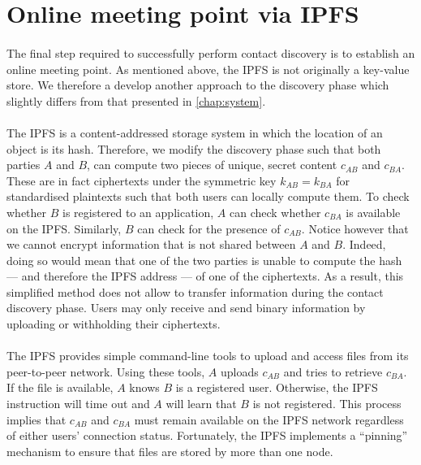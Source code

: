 \section{Online meeting point via IPFS}

	\paragraph{} The final step required to successfully perform contact discovery is to establish an online meeting point. As mentioned above, the IPFS is not originally a key-value store. We therefore a develop another approach to the discovery phase which slightly differs from that presented in \autoref{chap:system}.
	
	\paragraph{} The IPFS is a content-addressed storage system in which the location of an object is its hash. Therefore, we modify the discovery phase such that both parties $A$ and $B$, can compute two pieces of unique, secret content $c_{AB}$ and $c_{BA}$. These are in fact ciphertexts under the symmetric key $k_{AB} = k_{BA}$ for standardised plaintexts such that both users can locally compute them. To check whether $B$ is registered to an application, $A$ can check whether $c_{BA}$ is available on the IPFS. Similarly, $B$ can check for the presence of $c_{AB}$. Notice however that we cannot encrypt information that is not shared between $A$ and $B$. Indeed, doing so would mean that one of the two parties is unable to compute the hash --- and therefore the IPFS address --- of one of the ciphertexts. As a result, this simplified method does not allow to transfer information during the contact discovery phase. Users may only receive and send binary information by uploading or withholding their ciphertexts.
	
	\paragraph{} The IPFS provides simple command-line tools to upload and access files from its peer-to-peer network. Using these tools, $A$ uploads $c_{AB}$ and tries to retrieve $c_{BA}$. If the file is available, $A$ knows $B$ is a registered user. Otherwise, the IPFS instruction will time out and $A$ will learn that $B$ is not registered. This process implies that $c_{AB}$ and $c_{BA}$ must remain available on the IPFS network regardless of either users' connection status. Fortunately, the IPFS implements a ``pinning'' mechanism to ensure that files are stored by more than one node.


